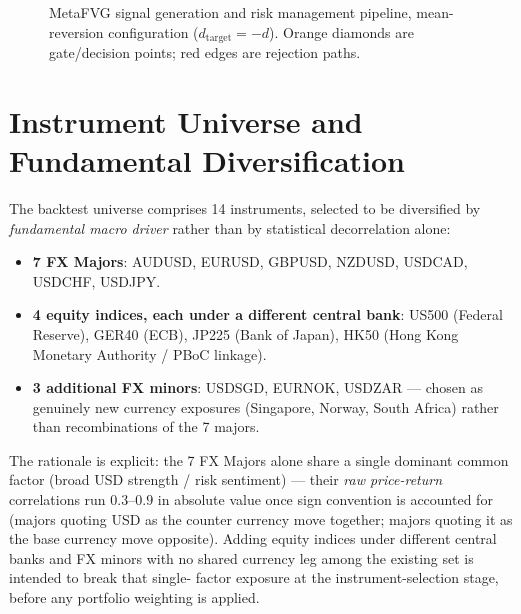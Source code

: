 \documentclass[11pt]{article}
\begin{document}
\begin{figure}[p]
{%
}
\caption{MetaFVG signal generation and risk management pipeline, mean-reversion configuration
($d_{\text{target}}=-d$). Orange diamonds are gate/decision points; red edges are rejection paths.}
\label{fig:pipeline}
\end{figure}

\section{Instrument Universe and Fundamental Diversification}
\label{sec:universe}
The backtest universe comprises 14 instruments, selected to be diversified by \emph{fundamental
macro driver} rather than by statistical decorrelation alone:
\begin{itemize}[nosep]
  \item \textbf{7 FX Majors}: AUDUSD, EURUSD, GBPUSD, NZDUSD, USDCAD, USDCHF, USDJPY.
  \item \textbf{4 equity indices, each under a different central bank}: US500 (Federal Reserve),
  GER40 (ECB), JP225 (Bank of Japan), HK50 (Hong Kong Monetary Authority / PBoC linkage).
  \item \textbf{3 additional FX minors}: USDSGD, EURNOK, USDZAR --- chosen as genuinely new
  currency exposures (Singapore, Norway, South Africa) rather than recombinations of the 7 majors.
\end{itemize}
The rationale is explicit: the 7 FX Majors alone share a single dominant common factor (broad USD
strength / risk sentiment) --- their \emph{raw price-return} correlations run $0.3$--$0.9$ in absolute
value once sign convention is accounted for (majors quoting USD as the counter currency move together;
majors quoting it as the base currency move opposite). Adding equity indices under different central
banks and FX minors with no shared currency leg among the existing set is intended to break that single-
factor exposure at the instrument-selection stage, before any portfolio weighting is applied.
\end{document}
